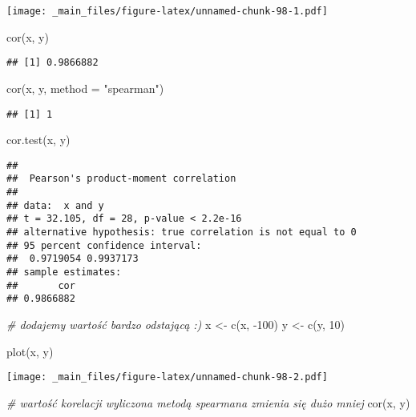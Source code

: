 \documentclass[
]{book}
\newenvironment{Shaded}{\begin{snugshade}}{\end{snugshade}}
\newcommand{\AttributeTok}[1]{\textcolor[rgb]{0.77,0.63,0.00}{#1}}
\newcommand{\CommentTok}[1]{\textcolor[rgb]{0.56,0.35,0.01}{\textit{#1}}}
\newcommand{\DecValTok}[1]{\textcolor[rgb]{0.00,0.00,0.81}{#1}}
\newcommand{\FunctionTok}[1]{\textcolor[rgb]{0.00,0.00,0.00}{#1}}
\newcommand{\NormalTok}[1]{#1}
\newcommand{\OtherTok}[1]{\textcolor[rgb]{0.56,0.35,0.01}{#1}}
\newcommand{\SpecialCharTok}[1]{\textcolor[rgb]{0.00,0.00,0.00}{#1}}
\newcommand{\StringTok}[1]{\textcolor[rgb]{0.31,0.60,0.02}{#1}}
\begin{document}
\texttt{[image: \_main\_files/figure-latex/unnamed-chunk-98-1.pdf]}

\begin{Shaded}
\begin{Highlighting}[]
\FunctionTok{cor}\NormalTok{(x, y)}
\end{Highlighting}
\end{Shaded}

\begin{verbatim}
## [1] 0.9866882
\end{verbatim}

\begin{Shaded}
\begin{Highlighting}[]
\FunctionTok{cor}\NormalTok{(x, y, }\AttributeTok{method =} \StringTok{"spearman"}\NormalTok{)}
\end{Highlighting}
\end{Shaded}

\begin{verbatim}
## [1] 1
\end{verbatim}

\begin{Shaded}
\begin{Highlighting}[]
\FunctionTok{cor.test}\NormalTok{(x, y)}
\end{Highlighting}
\end{Shaded}

\begin{verbatim}
## 
##  Pearson's product-moment correlation
## 
## data:  x and y
## t = 32.105, df = 28, p-value < 2.2e-16
## alternative hypothesis: true correlation is not equal to 0
## 95 percent confidence interval:
##  0.9719054 0.9937173
## sample estimates:
##       cor 
## 0.9866882
\end{verbatim}

\begin{Shaded}
\begin{Highlighting}[]
\CommentTok{\# dodajemy wartość bardzo odstającą :)}
\NormalTok{x }\OtherTok{\textless{}{-}} \FunctionTok{c}\NormalTok{(x, }\SpecialCharTok{{-}}\DecValTok{100}\NormalTok{)}
\NormalTok{y }\OtherTok{\textless{}{-}} \FunctionTok{c}\NormalTok{(y, }\DecValTok{10}\NormalTok{)}

\FunctionTok{plot}\NormalTok{(x, y)}
\end{Highlighting}
\end{Shaded}

\texttt{[image: \_main\_files/figure-latex/unnamed-chunk-98-2.pdf]}

\begin{Shaded}
\begin{Highlighting}[]
\CommentTok{\# wartość korelacji wyliczona metodą spearmana zmienia się dużo mniej}
\FunctionTok{cor}\NormalTok{(x, y)}
\end{Highlighting}
\end{Shaded}
\end{document}
